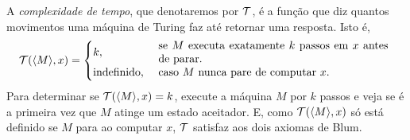 \begin{example}
    \label{ex:time_complexity}
    A \emph{complexidade de tempo},
    que denotaremos por ${\mathcal{T}}$,
    é a função que diz quantos movimentos
    uma máquina de Turing faz até retornar uma resposta.
    Isto é,
    \begin{equation*}
        \PhiDT( \langle M \rangle, x ) = \begin{cases}
            k, & \text{
                \parbox{0.6\textwidth}{
                    se $M$ executa exatamente $k$ passos em $x$ antes de parar.
                }
            } \\
            \text{indefinido}, & \text{
                \parbox{0.6\textwidth}{
                    caso $M$ nunca pare de computar $x$.
                }
            }
        \end{cases}
    \end{equation*}
    Para determinar se ${\mathcal{T}}( \langle M \rangle, x) = k$,
    execute a máquina $M$ por $k$ passos
    e veja se é a primeira vez que
    $M$ atinge um estado aceitador.
    E, como ${\mathcal{T}}( \langle M \rangle, x)$ só está definido se $M$ para ao computar $x$,
    ${\mathcal{T}}$ satisfaz aos dois axiomas de Blum.
\end{example}

